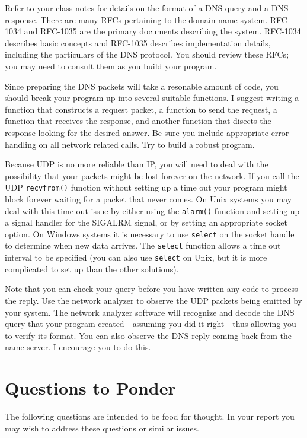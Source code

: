 \documentclass[twocolumn]{article}
\begin{document}
Refer to your class notes for details on the format of a DNS query and a DNS response. There are
many RFCs pertaining to the domain name system. RFC-1034 and RFC-1035 are the primary documents
describing the system. RFC-1034 describes basic concepts and RFC-1035 describes implementation
details, including the particulars of the DNS protocol. You should review these RFCs; you may
need to consult them as you build your program.

Since preparing the DNS packets will take a resonable amount of code, you should break your
program up into several suitable functions. I suggest writing a function that constructs a
request packet, a function to send the request, a function that receives the response, and
another function that disects the response looking for the desired answer. Be sure you include
appropriate error handling on all network related calls. Try to build a robust program.

Because UDP is no more reliable than IP, you will need to deal with the possibility that your
packets might be lost forever on the network. If you call the UDP \texttt{recvfrom()} function
without setting up a time out your program might block forever waiting for a packet that never
comes. On Unix systems you may deal with this time out issue by either using the
\texttt{alarm()} function and setting up a signal handler for the SIGALRM signal, or by setting
an appropriate socket option. On Windows systems it is necessary to use \texttt{select} on the
socket handle to determine when new data arrives. The \texttt{select} function allows a time out
interval to be specified (you can also use \texttt{select} on Unix, but it is more complicated
to set up than the other solutions).

Note that you can check your query before you have written any code to process the reply. Use
the network analyzer to observe the UDP packets being emitted by your system. The network
analyzer software will recognize and decode the DNS query that your program created---assuming
you did it right---thus allowing you to verify its format. You can also observe the DNS reply
coming back from the name server. I encourage you to do this.

\section{Questions to Ponder}

The following questions are intended to be food for thought. In your report you may wish to
address these questions or similar issues.
\end{document}
